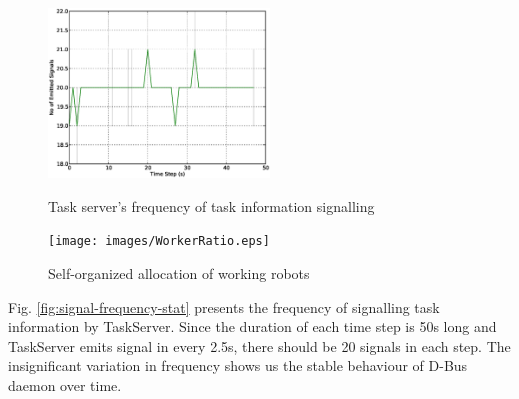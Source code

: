 \documentclass{llncs}
\begin{document}
\begin{figure}
\begin{minipage}[t]{0.48\linewidth}
\centering
\includegraphics[height=4.5cm, angle=0]
{images/global/Global-SignalingFreqStat.eps}
\caption{\small Task server's frequency of task information signalling}
\label{fig:signal-frequency-stat}
%
\end{minipage}
\hspace{0.5cm}
\begin{minipage}[t]{0.48\linewidth}
\centering
\texttt{[image: images/WorkerRatio.eps]}
\caption{\small Self-organized allocation of working robots }
\label{fig:translation-stat} %
\end{minipage}
\end{figure}
Fig. \ref{fig:signal-frequency-stat} presents the frequency of signalling task information by TaskServer. Since the duration of each time step is 50s long and TaskServer emits signal in every 2.5s, there should be 20 signals in each step. The insignificant variation in frequency shows us the stable behaviour of D-Bus daemon over time.
\end{document}
